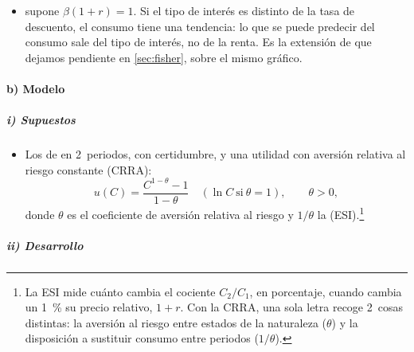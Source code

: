 \documentclass[11pt]{article}
\begin{document}
\begin{itemize}
\item {} supone $\beta(1+r)=1$. Si el tipo de interés es distinto de la tasa de descuento, el consumo tiene una tendencia: lo que se puede predecir del consumo sale del tipo de interés, no de la renta. Es la extensión de  que dejamos pendiente en \ref{sec:fisher}, sobre el mismo gráfico.
\end{itemize}

\paragraph{b) Modelo}

\subparagraph{i) Supuestos}

\begin{itemize}
\item Los de  en 2~periodos, con certidumbre, y una utilidad con aversión relativa al riesgo constante (CRRA):
  \begin{equation*}
  u(C)=\frac{C^{1-\theta}-1}{1-\theta}\quad(\ln C\ \text{si}\ \theta=1),\qquad \theta>0,
  \end{equation*}
  donde $\theta$ es el coeficiente de aversión relativa al riesgo y $1/\theta$ la  (ESI).\footnote{La ESI mide cuánto cambia el cociente $C_2/C_1$, en porcentaje, cuando cambia un 1~\% su precio relativo, $1+r$. Con la CRRA, una sola letra recoge 2~cosas distintas: la aversión al riesgo entre estados de la naturaleza ($\theta$) y la disposición a sustituir consumo entre periodos ($1/\theta$).}
\end{itemize}

\subparagraph{ii) Desarrollo}
\end{document}
